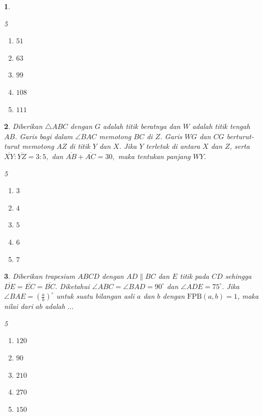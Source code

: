 \documentclass[11pt,a4paper,DIV=12]{scrartcl}
\theoremstyle{problemstyle}
\newtheorem{problem}{}
\theoremstyle{answerstyle}
\newenvironment{choices}[1][5]{%
  \begin{multicols}{#1}%
  \begin{enumerate}[label=(\Alph*)]%
}{%
  \end{enumerate}%
  \end{multicols}%
}
\begin{document}
\begin{problem}
\begin{center}
  \end{center}
  \begin{choices}
    \item $51$
    \item $63$
    \item $99$
    \item $108$
    \item $111$
  \end{choices}
\end{problem}

\begin{problem}
  Diberikan \(\triangle ABC\) dengan \(G\) adalah titik beratnya dan \(W\) adalah titik tengah \(AB\).
  Garis bagi dalam \(\angle BAC\) memotong \(BC\) di \(Z\).
  Garis \(WG\) dan \(CG\) berturut-turut memotong \(AZ\) di titik \(Y\) dan \(X\). Jika \(Y\) terletak di antara \(X\) dan \(Z\), serta
  $
    \overline{XY} : \overline{YZ} = 3 : 5,
  $
  dan
  $
    \overline{AB}+\overline{AC}=30,
  $
  maka tentukan panjang \(WY\).
  \begin{choices}
    \item $3$
    \item $4$
    \item $5$
    \item $6$
    \item $7$
  \end{choices}
\end{problem}

\begin{problem}
  Diberikan trapesium \(ABCD\) dengan \(AD \parallel BC\) dan \(E\) titik pada \(CD\) sehingga
  $
    \overline{DE} = \overline{EC} = \overline{BC}.
  $
  Diketahui
  $
    \angle ABC=\angle BAD=90^\circ
  $
  dan
  $
    \angle ADE=75^\circ.
  $
  Jika
  $
    \angle BAE=\left(\frac{a}{b}\right)^\circ
  $
  untuk suatu bilangan asli \(a\) dan \(b\) dengan \(\text{FPB}(a,b)=1\), maka nilai dari \(ab\) adalah \(\dots\)

  \begin{choices}
    \item $120$
    \item $90$
    \item $210$
    \item $270$
    \item $150$
  \end{choices}
\end{problem}
\end{document}
